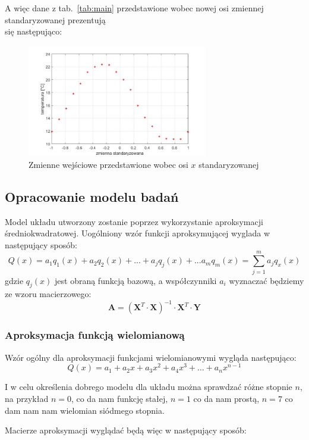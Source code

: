 \documentclass[a4paper, 12pt]{mwart}
\begin{document}
			A więc dane z tab.~\ref{tab:main} przedstawione wobec nowej osi zmiennej standaryzowanej
			prezentują\\się następująco:
			\begin{figure}[h]
				\begin{center}
					\includegraphics[width = 0.7\textwidth]{graphs/2B.jpg}
					\caption{Zmienne wejściowe przedstawione wobec osi $x$ standaryzowanej}
					\label{fig:2B}
				\end{center}
			\end{figure}

		\subsection{Opracowanie modelu badań}
			Model układu utworzony zostanie poprzez wykorzystanie aproksymacji średniokwadratowej.
			Uogólniony wzór funkcji aproksymującej wyglada w następujący sposób:
			$$ Q(x) = a_1 q_1(x) + a_2 q_2(x) + ... + a_j q_j(x) + ... a_m q_m(x) = \sum_{j=1}^m a_j q_x(x)$$
			gdzie $q_j(x)$ jest obraną funkcją bazową, a współczynniki $a_i$ wyznaczać będziemy ze
			wzoru macierzowego:
			$$ \textbf{A} = \left( \textbf{X}^T \cdot \textbf{X} \right)^{-1} \cdot \textbf{X}^T \cdot \textbf{Y} $$

			\subsubsection{Aproksymacja funkcją wielomianową}
				Wzór ogólny dla aproksymacji funkcjami wielomianowymi wygląda następująco:
				$$ Q(x) = a_1 + a_2x + a_3 x^2 + a_4 x^3 + \dots + a_n x^{n-1} $$
				
				I w celu określenia dobrego modelu dla układu można sprawdzać różne stopnie $n$, 
				na przykład $n=0$, co da nam funkcję stałej, $n=1$ co da nam prostą, $n=7$ co dam nam
				nam wielomian siódmego stopnia.

				Macierze aproksymacji wyglądać będą więc w następujący sposób:
\end{document}
